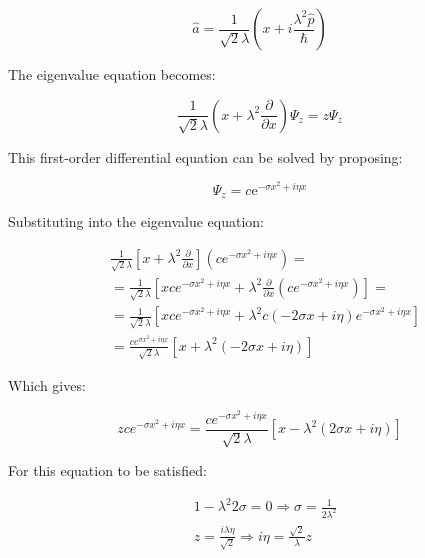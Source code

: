 \documentclass[italian]{HKNdocument}
\begin{document}
\begin{equation}
\hat{a}=\frac{1}{\sqrt{2} \lambda}\left(x+i \frac{\lambda^{2} \hat{p}}{\hbar}\right) \label{eq:7.47}
\end{equation}

The eigenvalue equation becomes:

\begin{equation}
\frac{1}{\sqrt{2} \lambda}\left(x+\lambda^{2} \frac{\partial}{\partial x}\right) \Psi_{z}=z \Psi_{z} \label{eq:7.48}
\end{equation}

This first-order differential equation can be solved by proposing:

\begin{equation}
\Psi_{z}=c \mathrm{e}^{-\sigma x^{2}+i \eta x} \label{eq:7.49}
\end{equation}

Substituting into the eigenvalue equation:

\begin{align}
& \frac{1}{\sqrt{2} \lambda}\left[x+\lambda^{2} \frac{\partial}{\partial x}\right]\left(c e^{-\sigma x^{2}+i \eta x}\right)= \\
& =\frac{1}{\sqrt{2} \lambda}\left[x c e^{-\sigma x^{2}+i \eta x}+\lambda^{2} \frac{\partial}{\partial x}\left(c e^{-\sigma x^{2}+i \eta x}\right)\right]= \\
& =\frac{1}{\sqrt{2} \lambda}\left[x c e^{-\sigma x^{2}+i \eta x}+\lambda^{2} c(-2 \sigma x+i \eta) e^{-\sigma x^{2}+i \eta x}\right]  \label{eq:7.50}\\
& =\frac{c e^{\sigma x^{2}+i \eta x}}{\sqrt{2} \lambda}\left[x+\lambda^{2}(-2 \sigma x+i \eta)\right]
\end{align}

Which gives:

\begin{equation}
z c e^{-\sigma x^{2}+i \eta x}=\frac{c e^{-\sigma x^{2}+i \eta x}}{\sqrt{2} \lambda}\left[x-\lambda^{2}(2 \sigma x+i \eta)\right] \label{eq:7.51}
\end{equation}

For this equation to be satisfied:

\begin{align}
& 1-\lambda^{2} 2 \sigma=0 \Longrightarrow \sigma=\frac{1}{2 \lambda^{2}} \\
& z=\frac{i \lambda \eta}{\sqrt{2}} \Longrightarrow i \eta=\frac{\sqrt{2}}{\lambda} z \label{eq:7.52}
\end{align}
\end{document}
